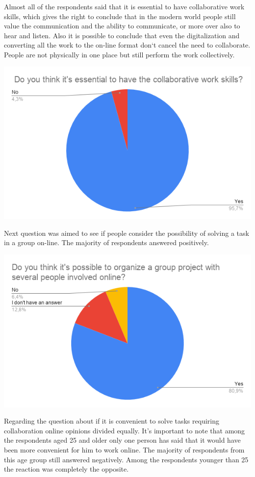 \documentclass[10pt,oneside,english,a4paper]{article}
\begin{document}
Almost all of the respondents said that it is essential to have collaborative work skills, which gives the right to conclude that in the modern world people still value the communication and the ability to communicate, or more over also to hear and listen. Also it is possible to conclude that even the digitalization and converting all the work to the on-line format don`t cancel the need to collaborate. People are not physically in one place but still perform the work collectively.

\includegraphics[width=\textwidth]{diagram2.png}

Next question was aimed to see if people consider the possibility of solving a task in a group on-line. The majority of respondents answered positively. 

\includegraphics[width=\textwidth]{diagram1.png}

Regarding the question about if it is convenient to solve tasks requiring collaboration online opinions divided equally. It’s important to note that among the respondents aged 25 and older only one person has said that it would have been more convenient for him to work online. The majority of respondents from this age group still answered negatively. 
Among the respondents younger than 25 the reaction was completely the opposite. 
\end{document}

